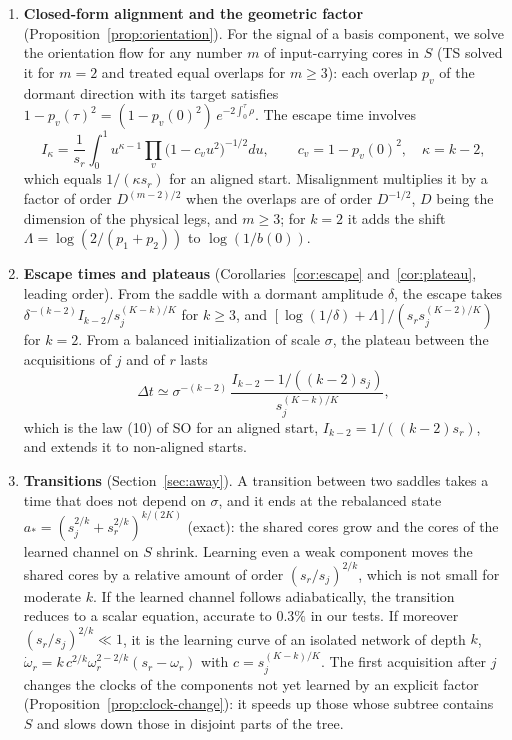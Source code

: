 \documentclass[11pt]{article}
\newcommand{\TS}{\textsf{TS}}
\newcommand{\SO}{\textsf{SO}}
\theoremstyle{definition}
\numberwithin{equation}{section}
\begin{document}
\begin{enumerate}[label=\textbf{R\arabic*.},leftmargin=*,itemsep=3pt]
\item \textbf{Closed-form alignment and the geometric factor} (Proposition~\ref{prop:orientation}). For the signal of a basis component, we solve the orientation flow for any number $m$ of input-carrying cores in $S$ (\TS{} solved it for $m=2$ and treated equal overlaps for $m\ge3$): each overlap $p_v$ of the dormant direction with its target satisfies $1-p_v(\tau)^2=(1-p_v(0)^2)\,e^{-2\int_0^\tau\rho}$. The escape time involves
\[
I_\kappa=\frac1{s_r}\int_0^1u^{\kappa-1}\prod_v\big(1-c_vu^2\big)^{-1/2}du,\qquad c_v=1-p_v(0)^2,\quad\kappa=k-2,
\]
which equals $1/(\kappa s_r)$ for an aligned start. Misalignment multiplies it by a factor of order $D^{(m-2)/2}$ when the overlaps are of order $D^{-1/2}$, $D$ being the dimension of the physical legs, and $m\ge3$; for $k=2$ it adds the shift $\Lambda=\log(2/(p_1+p_2))$ to $\log(1/b(0))$.

\item \textbf{Escape times and plateaus} (Corollaries~\ref{cor:escape} and~\ref{cor:plateau}, leading order). From the saddle with a dormant amplitude $\delta$, the escape takes $\delta^{-(k-2)}I_{k-2}/s_j^{(K-k)/K}$ for $k\ge3$, and $[\log(1/\delta)+\Lambda]/(s_rs_j^{(K-2)/K})$ for $k=2$. From a balanced initialization of scale $\sigma$, the plateau between the acquisitions of $j$ and of $r$ lasts
\[
\Delta t\simeq\sigma^{-(k-2)}\,\frac{I_{k-2}-1/((k-2)s_j)}{s_j^{(K-k)/K}},
\]
which is the law (10) of \SO{} for an aligned start, $I_{k-2}=1/((k-2)s_r)$, and extends it to non-aligned starts.

\item \textbf{Transitions} (Section~\ref{sec:away}). A transition between two saddles takes a time that does not depend on $\sigma$, and it ends at the rebalanced state $a_*=(s_j^{2/k}+s_r^{2/k})^{k/(2K)}$ (exact): the shared cores grow and the cores of the learned channel on $S$ shrink. Learning even a weak component moves the shared cores by a relative amount of order $(s_r/s_j)^{2/k}$, which is not small for moderate $k$. If the learned channel follows adiabatically, the transition reduces to a scalar equation, accurate to $0.3\%$ in our tests. If moreover $(s_r/s_j)^{2/k}\ll1$, it is the learning curve of an isolated network of depth $k$, $\dot\omega_r=k\,c^{2/k}\omega_r^{2-2/k}(s_r-\omega_r)$ with $c=s_j^{(K-k)/K}$. The first acquisition after $j$ changes the clocks of the components not yet learned by an explicit factor (Proposition~\ref{prop:clock-change}): it speeds up those whose subtree contains $S$ and slows down those in disjoint parts of the tree.


\end{enumerate}
\end{document}
